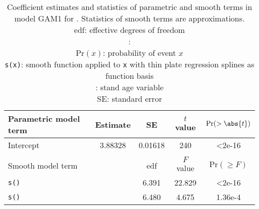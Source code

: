 \begin{singlespace}
  \begin{table}[h]
    \caption{Coefficient estimates and statistics of parametric and smooth terms in model GAM1 for \Spruce{}.  Statistics of smooth terms are approximations. \\
      edf: effective degrees of freedom \\
      \texttt{\ProductivityIndexVariableR{}}: \ProductivityIndexVariableText{} \\
      \(\text{Pr}(x)\): probability of event \(x\) \\
      \texttt{s(x)}: smooth function applied to \texttt{x} with thin plate regression splines as function basis \\
      \texttt{\StandAgeVariableR{}}: stand age variable \\
      SE: standard error}
    \label{tab:StatisticsGAM1Spruce}
    {\tabulinesep=2mm
      \begin{tabu}{L
          S[table-format = 1.5]
          S[table-format = 1.5]
          S[table-format = 3.3]
          S[table-format = 1.2e-2, table-comparator = true]
        }
        \toprule
        Parametric model term & {Estimate} & {SE} & {\(t\) value} & {\(\text{Pr}(> \abs{t})\)} \\
        \midrule
        Intercept & 3.88328 & 0.01618 & 240 & <2e-16 \\
        \\
        Smooth model term &  & {edf} & {\(F\) value} & {\(\text{Pr}(\geq F)\)} \\
        \midrule
        \texttt{s(\StandAgeVariableR{})} & & 6.391 & 22.829 & <2e-16 \\
        \texttt{s(\ProductivityIndexVariableR{})} & & 6.480 & 4.675 & 1.36e-4 \\
        \bottomrule
      \end{tabu}
    }
  \end{table}
\end{singlespace}

